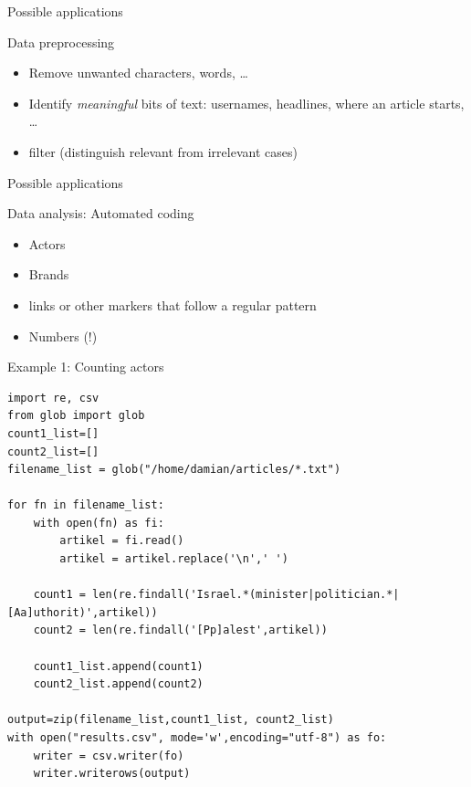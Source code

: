 \documentclass[compress]{beamer}
\begin{document}
\begin{frame}{Possible applications}
\begin{block}{Data preprocessing}
\begin{itemize}
\item Remove unwanted characters, words, \ldots
\item Identify \emph{meaningful} bits of text: usernames, headlines, where an article starts, \ldots
\item filter (distinguish relevant from irrelevant cases)
\end{itemize}
\end{block}
\end{frame}


\begin{frame}{Possible applications}
\begin{block}{Data analysis: Automated coding}
\begin{itemize}
\item Actors
\item Brands
\item links or other markers that follow a regular pattern
\item Numbers (!)
\end{itemize}
\end{block}
\end{frame}

\begin{frame}{Example 1: Counting actors}
\begin{lstlisting}
import re, csv
from glob import glob
count1_list=[]
count2_list=[]
filename_list = glob("/home/damian/articles/*.txt")

for fn in filename_list:
    with open(fn) as fi:
        artikel = fi.read()
        artikel = artikel.replace('\n',' ')

    count1 = len(re.findall('Israel.*(minister|politician.*|[Aa]uthorit)',artikel))
    count2 = len(re.findall('[Pp]alest',artikel))

    count1_list.append(count1)
    count2_list.append(count2)

output=zip(filename_list,count1_list, count2_list)
with open("results.csv", mode='w',encoding="utf-8") as fo:
    writer = csv.writer(fo)
    writer.writerows(output)
\end{lstlisting}
\end{frame}
\end{document}
